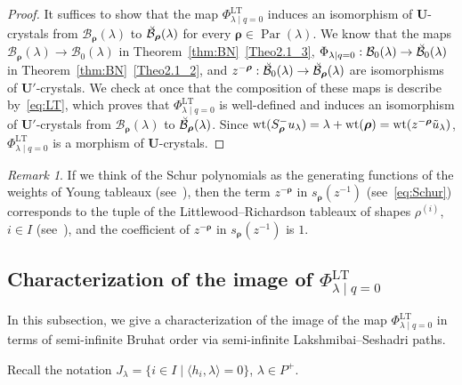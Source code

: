 \documentclass[10pt]{amsart}
\theoremstyle{definition}\newtheorem{defi}[theo]{Definition}
\theoremstyle{remark}\newtheorem{rema}[theo]{Remark}
\newcommand\bmrho[1]{\boldsymbol{#1}}
\newcommand{\U}{\mathbf{U}}
\DeclareMathOperator{\wt}{wt}
\DeclareMathOperator{\LT}{LT}
\DeclareMathOperator{\Par}{Par}
\begin{document}
\begin{proof}
It suffices to show that the map
$\Phi_{\lambda \mid q=0}^{\LT }$ 
induces an isomorphism of $\U$-crystals from
$\mathcal{B}_{\bmrho{\rho}}(\lambda)$
to
$\Breve{\mathcal{B}}_{\bmrho{\rho}}(\lambda)$
for every 
$\bmrho{\rho} \in \Par (\lambda)$.
We know that the maps
$\mathcal{B}_{\bmrho{\rho}}(\lambda) \rightarrow \mathcal{B}_0(\lambda)$ 
in Theorem~\ref{thm:BN}~\ref{Theo2.1_3}, 
$\Phi_{\lambda \mid q=0} : 
\mathcal{B}_0(\lambda)
\rightarrow 
\Breve{\mathcal{B}}_0(\lambda)$
in Theorem~\ref{thm:BN}~\ref{Theo2.1_2}, and 
$z^{-\bmrho{\rho}} : 
\Breve{\mathcal{B}}_0(\lambda)
\rightarrow 
\Breve{\mathcal{B}}_{\bmrho{\rho}}(\lambda)$
are isomorphisms of $\U'$-crystals. 
We check at once that the composition of these maps is describe by~\eqref{eq:LT}, 
which proves that 
$\Phi_{\lambda \mid q=0}^{\LT }$ 
is well-defined and induces an isomorphism of $\U'$-crystals from 
$\mathcal{B}_{\bmrho{\rho}}(\lambda)$
to
$\Breve{\mathcal{B}}_{\bmrho{\rho}}(\lambda)$. 
Since 
$\wt (S_{\bmrho{\rho}}^- u_{\lambda}) 
= 
\lambda + \wt (\bmrho{\rho})
=
\wt (z^{-\bmrho{\rho}} \Tilde{u}_{\lambda})$, 
$\Phi_{\lambda \mid q=0}^{\LT }$ 
is a morphism of $\U$-crystals. 
\end{proof}

\begin{rema} \label{rem:LT}
If we think of the Schur polynomials
as the generating functions of the 
weights of Young tableaux (see~\cite[Page~3]{F}), 
then the term
$z^{-\bmrho{\rho}}$
in 
$s_{\bmrho{\rho}}(z^{-1})$ 
(see~\eqref{eq:Schur})
corresponds to the tuple 
of the Littlewood--Richardson tableaux 
of shapes $\rho^{(i)}$, $i \in I$
(see~\cite[\S~5.2]{F}), 
and the coefficient of 
$z^{-\bmrho{\rho}}$
in 
$s_{\bmrho{\rho}}(z^{-1})$
is $1$. 
\end{rema}

\subsection{Characterization of the image of \texorpdfstring{$\Phi_{\lambda \mid q=0}^{\LT }$}{Phi lambda|q=0 LT}}

In this subsection, we give a characterization of the image of the map 
$\Phi_{\lambda \mid q=0}^{\LT }$
in terms of semi-infinite Bruhat order 
via semi-infinite Lakshmibai--Seshadri paths. 

Recall the notation 
$J_{\lambda} = \{ i \in I \mid \langle h_i , \lambda \rangle = 0 \}$, 
$\lambda \in P^+$. 
\end{document}
